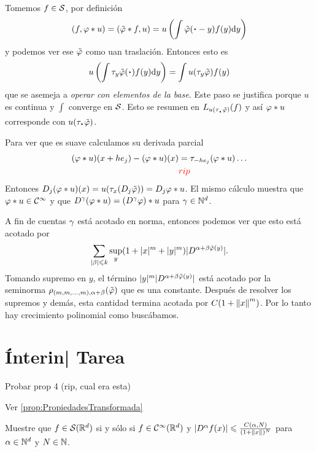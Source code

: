 \documentclass[12pt]{memoir}
\begin{document}
\begin{ptcbp}
  Tomemos $f\in\mathcal{S}$, por definición 
  $$(f,\vf\ast u)=(\tilde{\vf}\ast f,u)=u\left(\int\tilde\vf(\.-y)f(y)\dd y\right)$$
  y podemos ver ese $\tilde{\varphi}$ como uan traslación. Entonces esto es 
  $$u\left(\int\tau_y\tilde{\vf}(\.)f(y)\dd y\right)=\int u(\tau_y\tilde{\vf})f(y)$$
  que se asemeja a \emph{operar con elementos de la base}. Este paso se justifica porque $u$ es continua y $\int$ converge en $\mathcal{S}$. Esto se resumen en $L_{u(\tau_{\.}\tilde{\vf})}(f)$ y así $\varphi\ast u$ corresponde con $u(\tau_{\.} \tilde{\vf})$.\par 
  Para ver que es suave calculamos su derivada parcial
  \begin{align*}
    (\varphi\ast u)(x+he_j)-(\varphi\ast u)(x)&=\tau_{-he_j}(\varphi\ast u)\dots\\
    & \textcolor{red}{rip}
  \end{align*}
  Entonces $D_j(\varphi\ast u)(x)=u(\tau_x(D_j\tilde{\varphi}))=D_j\varphi\ast u$. El mismo cálculo muestra que $\varphi\ast u\in\mathcal{C}^\infty$ y que $D^\gamma(\varphi\ast u)=(D^\gamma\varphi)\ast u$ para $\gamma\in\mathbb{N}^d$. \par 
  \par 

A fin de cuentas $\gamma$ está acotado en norma, entonces podemos ver que esto está acotado por
$$\sum_{|\beta|\leqslant k}\sup_y(1+|x|^m+|y|^m)|D^{\alpha+\beta\tilde{\varphi}(y)}|.$$
Tomando supremo en $y$, el término $|y|^m|D^{\alpha+\beta\tilde{\varphi}(y)}|$ está acotado por la seminorma $\rho_{(m,m,\dots,m),\alpha+\beta}(\tilde{\varphi})$ que es una constante. Después de resolver los supremos y demás, esta cantidad termina acotada por $C(1+\left\|x\right\|^m)$. Por lo tanto hay crecimiento polinomial como buscábamos.\par 
{}
\end{ptcbp}


\section{Ínterin| Tarea}

\begin{Ej}
  Probar prop 4 (rip, cual era esta)
  \end{Ej}

  Ver \ref{prop:PropiedadesTransformada}
\begin{Ej}
 Muestre que $f\in\mathcal{S}(\mathbb{R}^d)$ si y sólo si $f\in\mathcal{C}^\infty(\mathbb{R}^d)$ y $|D^\alpha f(x)|\leqslant \frac{C(\alpha,N)}{(1+\left\|x\right\|)^N}$ para $\alpha\in\mathbb{N}^d$ y $N\in\mathbb{N}$.
\end{Ej}
\end{document}
